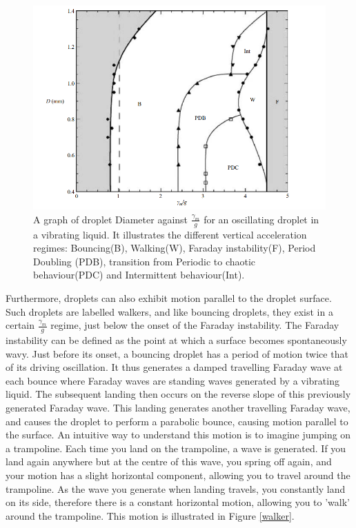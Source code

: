 \begin{figure}[ht]
\includegraphics[width=12cm]{theory/regime}
\centering
\caption{A graph of droplet Diameter against $\frac{\gamma_{m}}{g}$ for an oscillating droplet in a vibrating liquid. It illustrates the different vertical acceleration regimes: Bouncing(B), Walking(W), Faraday instability(F), Period Doubling (PDB), transition from Periodic to chaotic behaviour(PDC)  and Intermittent behaviour(Int).}
\centering
\label{regimes}
\end{figure}

Furthermore, droplets can also exhibit motion parallel to the droplet surface. Such droplets are labelled walkers, and like bouncing droplets, they exist in a certain $\frac{\gamma_{m}}{g}$ regime, just below the onset of the Faraday instability. The Faraday instability can be defined as the point at which a surface becomes spontaneously wavy. Just before its onset, a bouncing droplet has a period of motion twice that of its driving oscillation. It thus generates a damped travelling Faraday wave at each bounce where Faraday waves are standing waves generated by a vibrating liquid. The subsequent landing then occurs on the reverse slope of this previously generated Faraday wave. This landing generates another travelling Faraday wave, and causes the droplet to perform a parabolic bounce, causing motion parallel to the surface. An intuitive way to understand this motion is to imagine jumping on a trampoline. Each time you land on the trampoline, a wave is generated. If you land again anywhere but at the centre of this wave, you spring off again, and your motion has a slight horizontal component, allowing you to travel around the trampoline. As the wave you generate when landing travels, you constantly land on its side, therefore there is a constant horizontal motion, allowing you to 'walk' around the trampoline. This motion is illustrated in Figure \ref{walker}. 

